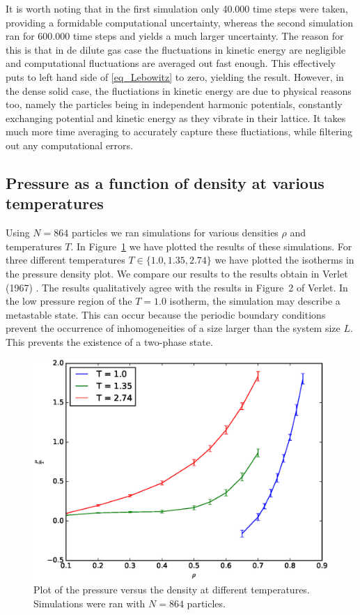 \documentclass[twoside]{article}
\begin{document}
It is worth noting that in the first simulation only 40.000 time steps were taken, providing a formidable computational uncertainty, whereas the second simulation ran for 600.000 time steps and yields a much larger uncertainty. The reason for this is that in de dilute gas case the fluctuations in kinetic energy are negligible and computational fluctuations are averaged out fast enough. This effectively puts to left hand side of \eqref{eq_Lebowitz} to zero, yielding the result. However, in the dense solid case, the fluctiations in kinetic energy are due to physical reasons too, namely the particles being in independent harmonic potentials, constantly exchanging potential and kinetic energy as they vibrate in their lattice. It takes much more time averaging to accurately capture these fluctiations, while filtering out any computational errors. 

\subsection{Pressure as a function of density at various temperatures}
Using $N = 864$ particles we ran simulations for various densities $\rho$ and temperatures $T$. In Figure~\ref{fig:figure_pressure} we have plotted the results of these simulations. For three different temperatures $T \in \{1.0, 1.35, 2.74 \}$ we have plotted the isotherms in the pressure density plot. We compare our results to the results obtain in Verlet (1967) \cite{ref_verlet}. The results qualitatively agree with the results in Figure~2 of Verlet. In the low pressure region of the $T=1.0$ isotherm, the simulation may describe a metastable state. This can occur because the periodic boundary conditions prevent the occurrence of inhomogeneities of a size larger than the system size $L$. This prevents the existence of a two-phase state.

\begin{figure}[h]
\centering
\includegraphics[width=0.6\linewidth]{fig/figure_pressure}
\caption{Plot of the pressure versus the density at different temperatures. Simulations were ran with $N=864$ particles.}
\label{fig:figure_pressure}
\end{figure}
\end{document}
